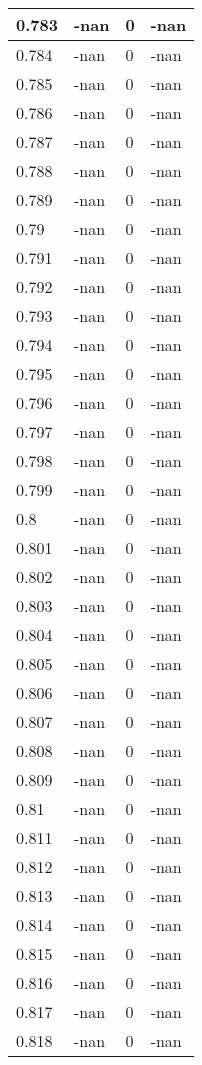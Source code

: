 \documentclass[a4paper,14pt]{extarticle}
\begin{document}
\begin{longtable}{||m{3cm}||m{3cm}|m{3cm}||m{3cm}||}
\hline
0.783 & -nan & 0 & -nan\\
\hline
0.784 & -nan & 0 & -nan\\
\hline
0.785 & -nan & 0 & -nan\\
\hline
0.786 & -nan & 0 & -nan\\
\hline
0.787 & -nan & 0 & -nan\\
\hline
0.788 & -nan & 0 & -nan\\
\hline
0.789 & -nan & 0 & -nan\\
\hline
0.79 & -nan & 0 & -nan\\
\hline
0.791 & -nan & 0 & -nan\\
\hline
0.792 & -nan & 0 & -nan\\
\hline
0.793 & -nan & 0 & -nan\\
\hline
0.794 & -nan & 0 & -nan\\
\hline
0.795 & -nan & 0 & -nan\\
\hline
0.796 & -nan & 0 & -nan\\
\hline
0.797 & -nan & 0 & -nan\\
\hline
0.798 & -nan & 0 & -nan\\
\hline
0.799 & -nan & 0 & -nan\\
\hline
0.8 & -nan & 0 & -nan\\
\hline
0.801 & -nan & 0 & -nan\\
\hline
0.802 & -nan & 0 & -nan\\
\hline
0.803 & -nan & 0 & -nan\\
\hline
0.804 & -nan & 0 & -nan\\
\hline
0.805 & -nan & 0 & -nan\\
\hline
0.806 & -nan & 0 & -nan\\
\hline
0.807 & -nan & 0 & -nan\\
\hline
0.808 & -nan & 0 & -nan\\
\hline
0.809 & -nan & 0 & -nan\\
\hline
0.81 & -nan & 0 & -nan\\
\hline
0.811 & -nan & 0 & -nan\\
\hline
0.812 & -nan & 0 & -nan\\
\hline
0.813 & -nan & 0 & -nan\\
\hline
0.814 & -nan & 0 & -nan\\
\hline
0.815 & -nan & 0 & -nan\\
\hline
0.816 & -nan & 0 & -nan\\
\hline
0.817 & -nan & 0 & -nan\\
\hline
0.818 & -nan & 0 & -nan\\

\end{longtable}
\end{document}
